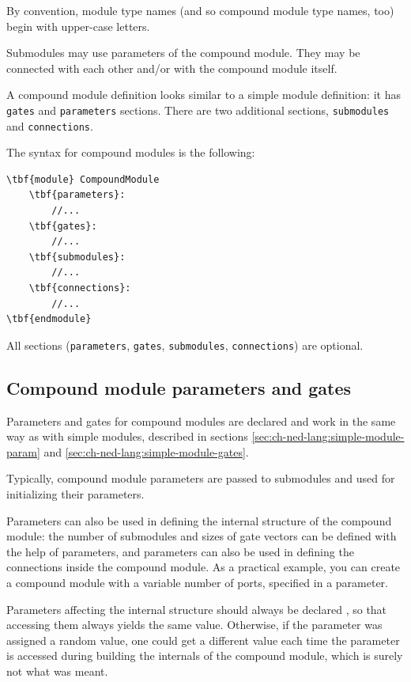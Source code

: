 By convention, module type names (and so compound module type names, too)
begin with upper-case letters.

Submodules may use parameters of the compound module.
They may be connected with each other and/or with
the compound module itself.

A compound module definition looks
similar to a simple module definition:
it has \texttt{gates} and \texttt{parameters} sections.
There are two additional sections, \texttt{submodules} and
\texttt{connections}.

The syntax for compound modules is the following:

\begin{Verbatim}[commandchars=\\\{\}]
\tbf{module} CompoundModule
    \tbf{parameters}:
        //...
    \tbf{gates}:
        //...
    \tbf{submodules}:
        //...
    \tbf{connections}:
        //...
\tbf{endmodule}
\end{Verbatim}

All sections (\texttt{parameters}, \texttt{gates}, \texttt{submodules},
\texttt{connections}) are optional.



\subsection{Compound module parameters and gates}

Parameters and gates 
for compound modules are declared and work in the same way
as with simple modules, described in sections
\ref{sec:ch-ned-lang:simple-module-param}
and \ref{sec:ch-ned-lang:simple-module-gates}.

Typically, compound module parameters are passed to submodules and
used for initializing their parameters.

Parameters can also be used in defining the internal structure of
the compound module: the number of submodules and sizes of gate vectors
can be defined with the help of parameters, and parameters can
also be used in defining the connections inside the compound module.
As a practical example, you can create a  compound module
with a variable number of ports, specified in a  parameter.

Parameters affecting the internal structure should always be declared
, so that accessing them always yields the same value.
Otherwise, if the parameter was assigned a random value, one could
get a different value each time the parameter is accessed during building
the internals of the compound module, which is surely not what was meant.

